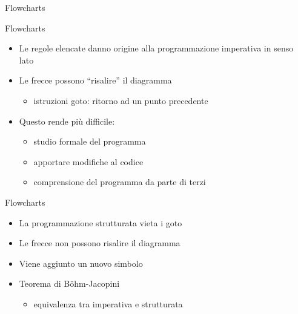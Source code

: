 \documentclass[xcolor=dvipsnames,handout]{beamer}
\begin{document}
\begin{frame}{Flowcharts}
  \vfill
  \begin{center}\end{center}
  \vfill
\end{frame}

\begin{frame}{Flowcharts}
  \vfill
  \begin{itemize}
    \item Le regole elencate danno origine alla programmazione imperativa in senso lato
    \vfill
    \item Le frecce possono ``risalire'' il diagramma
    \begin{itemize}
      \item istruzioni \alert{goto}: ritorno ad un punto precedente
    \end{itemize}
    \vfill
    \item Questo rende più difficile:
    \begin{itemize}
      \item studio formale del programma
      \item apportare modifiche al codice
      \item comprensione del programma da parte di terzi
    \end{itemize}
  \end{itemize}
\end{frame}

\begin{frame}{Flowcharts}
  \vfill
  \begin{itemize}
    \item La programmazione \alert{strutturata} vieta i goto
    \vfill
    \item Le frecce non possono risalire il diagramma
    \vfill
    \item Viene aggiunto un nuovo simbolo
    \vfill
    \item Teorema di Böhm-Jacopini
    \begin{itemize}
      \item \alert{equivalenza} tra imperativa e strutturata
    \end{itemize}
  \end{itemize}
\end{frame}
\end{document}
